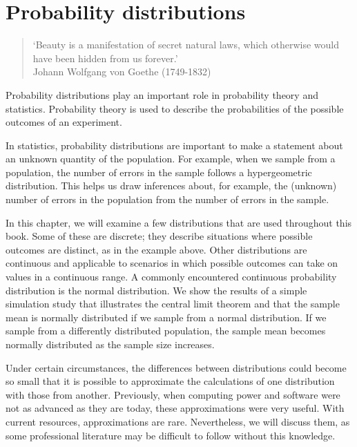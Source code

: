 
\chapter{Probability distributions} %
\label{cha:probability_distributions}

\begin{quote}
`Beauty is a manifestation of secret natural laws, which otherwise would have been hidden from us forever.'\\
Johann Wolfgang von Goethe (1749-1832)
\end{quote}

Probability distributions play an important role in probability theory and statistics. Probability theory is used to describe the probabilities of the possible outcomes of an experiment.

In statistics, probability distributions are important to make a statement about an unknown quantity of the population. For example, when we sample from a population, the number of errors in the sample follows a hypergeometric distribution. This helps us draw inferences about, for example, the (unknown) number of errors in the population from the number of errors in the sample. 

In this chapter, we will examine a few distributions that are used throughout this book. Some of these are discrete; they describe situations where possible outcomes are distinct, as in the example above. Other distributions are continuous and applicable to scenarios in which possible outcomes can take on values in a continuous range. A commonly encountered continuous probability distribution is the normal distribution. We show the results of a simple simulation study that illustrates the central limit theorem and that the sample mean is normally distributed if we sample from a normal distribution. If we sample from a differently distributed population, the sample mean becomes normally distributed as the sample size increases. 

Under certain circumstances, the differences between distributions could become so small that it is possible to approximate the calculations of one distribution with those from another. Previously, when computing power and software were not as advanced as they are today, these approximations were very useful. With current resources, approximations are rare. Nevertheless, we will discuss them, as some professional literature may be difficult to follow without this knowledge.

